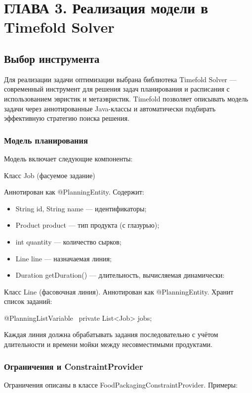 \chapter{ ГЛАВА 3. Реализация модели в Timefold Solver}
\label{ch:chapter3}

\section{ Выбор инструмента}

Для реализации задачи оптимизации выбрана библиотека Timefold Solver — современный инструмент для решения задач планирования и расписания с использованием эвристик и метаэвристик. Timefold позволяет описывать модель задачи через аннотированные Java-классы и автоматически подбирать эффективную стратегию поиска решения.

\subsection{Модель планирования}

Модель включает следующие компоненты: \

Класс Job (фасуемое задание)

Аннотирован как @PlanningEntity. Содержит:

\begin{itemize}
    \item String id, String name — идентификаторы;
    \item Product product — тип продукта (с глазурью);
    \item int quantity — количество сырков;
    \item Line line — назначаемая линия;
    \item Duration getDuration() — длительность, вычисляемая динамически:
\end{itemize}

Класс Line (фасовочная линия). Аннотирован как @PlanningEntity. Хранит список заданий:

@PlanningListVariable \
private List<Job> jobs; \

Каждая линия должна обрабатывать задания последовательно с учётом длительности и времени мойки между несовместимыми продуктами. \

\subsection{Ограничения и ConstraintProvider}

Ограничения описаны в классе FoodPackagingConstraintProvider. Примеры:

